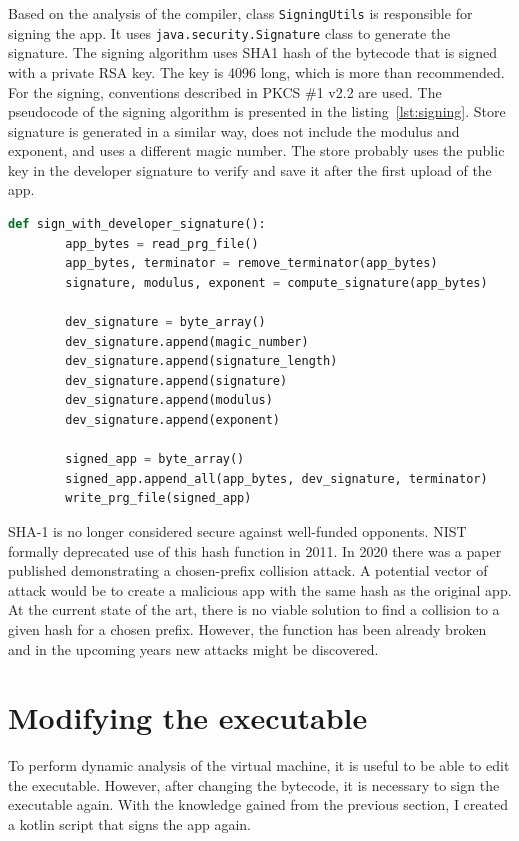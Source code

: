 Based on the analysis of the compiler, class \texttt{SigningUtils} is responsible for signing the app.
It uses \texttt{java.security.Signature} class to generate the signature.
The signing algorithm uses SHA1 hash of the bytecode that is signed with a private RSA key.
The key is 4096 long, which is more than recommended.
For the signing, conventions described in PKCS \#1 v2.2 are used\cite{java-signature,pkcs}.
The pseudocode of the signing algorithm is presented in the listing~\ref{lst:signing}.
Store signature is generated in a similar way, does not include the modulus and exponent, and uses a different magic number.
The store probably uses the public key in the developer signature to verify and save it after the first upload of the app.
\begin{lstlisting}[caption={Pseudocode of the signing algorithm, developer signature},captionpos=b,label={lst:signing},language=Python]
    def sign_with_developer_signature():
        app_bytes = read_prg_file()
        app_bytes, terminator = remove_terminator(app_bytes)
        signature, modulus, exponent = compute_signature(app_bytes)

        dev_signature = byte_array()
        dev_signature.append(magic_number)
        dev_signature.append(signature_length)
        dev_signature.append(signature)
        dev_signature.append(modulus)
        dev_signature.append(exponent)

        signed_app = byte_array()
        signed_app.append_all(app_bytes, dev_signature, terminator)
        write_prg_file(signed_app)
\end{lstlisting}

SHA-1 is no longer considered secure against well-funded opponents.
NIST formally deprecated use of this hash function in 2011.
In 2020 there was a paper published demonstrating a chosen-prefix collision attack.
A potential vector of attack would be to create a malicious app with the same hash as the original app.
At the current state of the art, there is no viable solution to find a collision to a given hash for a chosen prefix.
However, the function has been already broken and in the upcoming years new attacks might be discovered.

\section{Modifying the executable}
To perform dynamic analysis of the virtual machine, it is useful to be able to edit the executable.
However, after changing the bytecode, it is necessary to sign the executable again.
With the knowledge gained from the previous section, I created a kotlin script that signs the app again.

